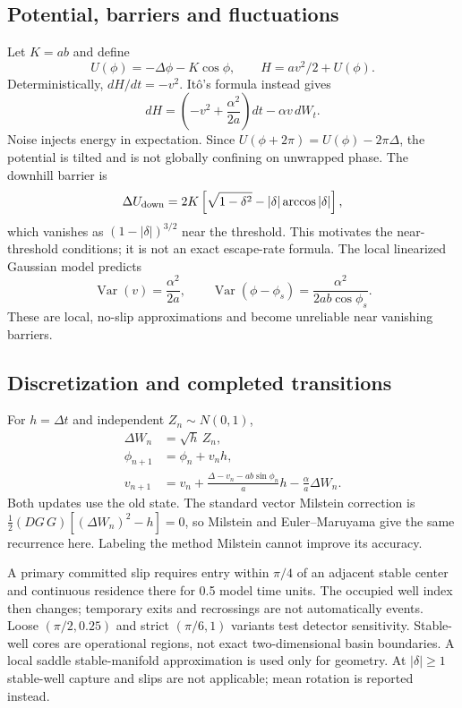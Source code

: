 \documentclass[11pt,a4paper]{article}
\begin{document}
\subsection{Potential, barriers and fluctuations}
Let $K=ab$ and define
\begin{equation}
U(\phi)=-\Delta\phi-K\cos\phi,\qquad H=av^2/2+U(\phi).
\end{equation}
Deterministically, $dH/dt=-v^2$. It\^o's formula instead gives
\begin{equation}
dH=\left(-v^2+\frac{\alpha^2}{2a}\right)dt-\alpha v\,dW_t.
\end{equation}
Noise injects energy in expectation. Since $U(\phi+2\pi)=U(\phi)-2\pi\Delta$, the potential is tilted and is not globally confining on unwrapped phase. The downhill barrier is
\begin{equation}
\Delta U_{\rm down}=2K\left[\sqrt{1-\delta^2}-|\delta|\arccos|\delta|\right],
\end{equation}
which vanishes as $(1-|\delta|)^{3/2}$ near the threshold. This motivates the near-threshold conditions; it is not an exact escape-rate formula. The local linearized Gaussian model predicts
\begin{equation}
\operatorname{Var}(v)=\frac{\alpha^2}{2a},\qquad
\operatorname{Var}(\phi-\phi_s)=\frac{\alpha^2}{2ab\cos\phi_s}.
\label{eq:localvar}
\end{equation}
These are local, no-slip approximations and become unreliable near vanishing barriers.

\subsection{Discretization and completed transitions}
For $h=\Delta t$ and independent $Z_n\sim N(0,1)$,
\begin{align}
\Delta W_n&=\sqrt h\,Z_n,\\
\phi_{n+1}&=\phi_n+v_nh,\\
v_{n+1}&=v_n+\frac{\Delta-v_n-ab\sin\phi_n}{a}h-\frac{\alpha}{a}\Delta W_n.
\end{align}
Both updates use the old state. The standard vector Milstein correction is $\tfrac12(DG\,G)[(\Delta W_n)^2-h]=0$, so Milstein and Euler--Maruyama give the same recurrence here. Labeling the method Milstein cannot improve its accuracy.

A primary committed slip requires entry within $\pi/4$ of an adjacent stable center and continuous residence there for 0.5 model time units. The occupied well index then changes; temporary exits and recrossings are not automatically events. Loose $(\pi/2,0.25)$ and strict $(\pi/6,1)$ variants test detector sensitivity. Stable-well cores are operational regions, not exact two-dimensional basin boundaries. A local saddle stable-manifold approximation is used only for geometry. At $|\delta|\ge1$ stable-well capture and slips are not applicable; mean rotation is reported instead.
\end{document}
